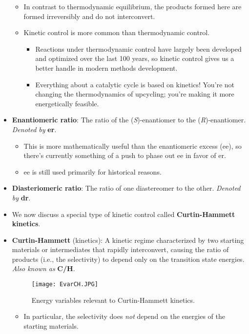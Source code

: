 \documentclass[../notes.tex]{subfiles}
\begin{document}
\begin{itemize}
\begin{itemize}
        \item In contrast to thermodynamic equilibrium, the products formed here are formed irreversibly and do not interconvert.
        \item Kinetic control is more common than thermodynamic control.
        \begin{itemize}
            \item Reactions under thermodynamic control have largely been developed and optimized over the last 100 years, so kinetic control gives us a better handle in modern methods development.
            \item Everything about a catalytic cycle is based on kinetics! You're not changing the thermodynamics of  upcycling; you're making it more energetically feasible.
        \end{itemize}
    \end{itemize}
    \item \textbf{Enantiomeric ratio}: The ratio of the (\emph{S})-enantiomer to the (\emph{R})-enantiomer. \emph{Denoted by} \textbf{er}.
    \begin{itemize}
        \item This is more mathematically useful than the enantiomeric excess (ee), so there's currently something of a push to phase out ee in favor of er.
        \item ee is still used primarily for historical reasons.
    \end{itemize}
    \item \textbf{Diasteriomeric ratio}: The ratio of one diastereomer to the other. \emph{Denoted by} \textbf{dr}.
    \item We now discuss a special type of kinetic control called \textbf{Curtin-Hammett kinetics}.
    \item \textbf{Curtin-Hammett} (kinetics): A kinetic regime characterized by two starting materials or intermediates that rapidly interconvert, causing the ratio of products (i.e., the selectivity) to depend only on the transition state energies. \emph{Also known as} \textbf{C/H}.
    \begin{figure}[H]
        \centering
        \texttt{[image: EvarCH.JPG]}
        \caption{Energy variables relevant to Curtin-Hammett kinetics.}
        \label{fig:EvarCH}
    \end{figure}
    \begin{itemize}
        \item In particular, the selectivity does \emph{not} depend on the energies of the starting materials.

\end{itemize}
\end{itemize}
\end{document}
